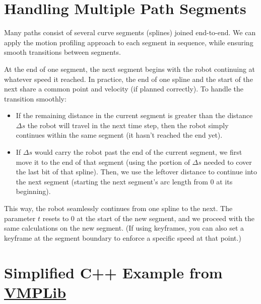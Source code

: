 \documentclass[11pt]{article}
\begin{document}
\section{Handling Multiple Path Segments}

Many paths consist of several curve segments (splines) joined end-to-end. We can apply the motion profiling approach to each segment in sequence, while ensuring smooth transitions between segments.

At the end of one segment, the next segment begins with the robot continuing at whatever speed it reached. In practice, the end of one spline and the start of the next share a common point and velocity (if planned correctly). To handle the transition smoothly:
\begin{itemize}
  \item If the remaining distance in the current segment is greater than the distance $\Delta s$ the robot will travel in the next time step, then the robot simply continues within the same segment (it hasn't reached the end yet).
  \item If $\Delta s$ would carry the robot past the end of the current segment, we first move it to the end of that segment (using the portion of $\Delta s$ needed to cover the last bit of that spline). Then, we use the leftover distance to continue into the next segment (starting the next segment's arc length from 0 at its beginning).
\end{itemize}

This way, the robot seamlessly continues from one spline to the next. The parameter $t$ resets to 0 at the start of the new segment, and we proceed with the same calculations on the new segment. (If using keyframes, you can also set a keyframe at the segment boundary to enforce a specific speed at that point.)

\section{Simplified C++ Example from \href{https://github.com/SerrialError/vmplib}{VMPLib}}
\end{document}
